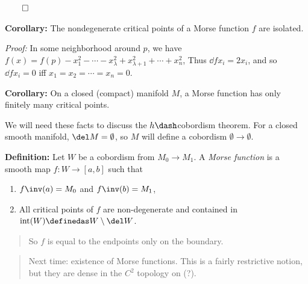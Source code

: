 \(\qed\)

\textbf{Corollary:} The nondegenerate critical points of a Morse
function \(f\) are isolated.

\emph{Proof:} In some neighborhood around \(p\), we have
\(f(x) = f(p) - x_1^2 - \cdots - x_\lambda^2 + x_{\lambda + 1}^2 + \cdots + x_n^2\),
Thus \(\dd{f}{x_i} = 2x_i\), and so \(\dd{f}{x_i} = 0\) iff
\(x_1 = x_2 = \cdots = x_n = 0\).

\textbf{Corollary:} On a closed (compact) manifold \(M\), a Morse
function has only finitely many critical points.

We will need these facts to discuss the \(h\dash\)cobordism theorem. For
a closed smooth manifold, \(\del M = \emptyset\), so \(M\) will define a
cobordism \(\emptyset \to \emptyset\).

\textbf{Definition:} Let \(W\) be a cobordism from \(M_0 \to M_1\). A
\emph{Morse function} is a smooth map \(f: W\to [a, b]\) such that

\begin{enumerate}
\def\labelenumi{\arabic{enumi}.}
\tightlist
\item
  \(f\inv(a) = M_0\) and \(f\inv(b) = M_1\),
\item
  All critical points of \(f\) are non-degenerate and contained in
  \(\mathrm{int}(W) \definedas W\setminus \del W\).
\end{enumerate}

\begin{quote}
So \(f\) is equal to the endpoints only on the boundary.
\end{quote}

\begin{quote}
Next time: existence of Morse functions. This is a fairly restrictive
notion, but they are dense in the \(C^2\) topology on (?).
\end{quote}





